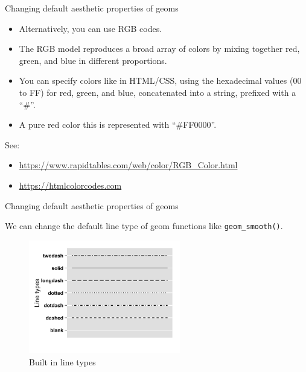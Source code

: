 \documentclass[ignorenonframetext,]{beamer}
\providecommand{\tightlist}{%
  \setlength{\itemsep}{0pt}\setlength{\parskip}{0pt}}
\begin{document}
\begin{frame}{Changing default aesthetic properties of geoms}
\protect\hypertarget{changing-default-aesthetic-properties-of-geoms-17}{}

\begin{itemize}
\item
  Alternatively, you can use RGB codes.
\item
  The RGB model reproduces a broad array of colors by mixing together
  red, green, and blue in different proportions.
\item
  You can specify colors like in HTML/CSS, using the hexadecimal values
  (00 to FF) for red, green, and blue, concatenated into a string,
  prefixed with a ``\#''.
\item
  A pure red color this is represented with ``\#FF0000''.
\end{itemize}

See:

\begin{itemize}
\tightlist
\item
  \url{https://www.rapidtables.com/web/color/RGB_Color.html}
\item
  \url{https://htmlcolorcodes.com}
\end{itemize}

\end{frame}

\begin{frame}[fragile]{Changing default aesthetic properties of geoms}
\protect\hypertarget{changing-default-aesthetic-properties-of-geoms-18}{}

We can change the default line type of geom functions like
\texttt{geom\_smooth()}.

\begin{figure}
\centering
\includegraphics[width=2.60417in,height=\textheight]{figures/lty.png}
\caption{Built in line types}
\end{figure}

\end{frame}
\end{document}
